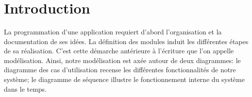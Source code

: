   \section*{Introduction}
  \paragraph{}
	La programmation d'une application requiert d'abord l'organisation et la documentation de ses idées. La définition des modules induit les différentes étapes de sa réalisation. C'est cette démarche antérieure à l'écriture que l'on appelle modélisation. Ainsi, notre modélisation est axée autour de deux diagrammes: le diagramme des cas d’utilisation recense les différentes fonctionnalités de notre système; le diagramme de séquence illustre le fonctionnement interne du système dans le temps.
    